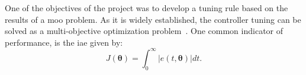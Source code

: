 %
%
One of the objectives of the project was to develop a tuning rule based on the results of a \gls{moo} problem. As it is widely established, the controller tuning can be solved as a multi-objective optimization problem~\cite{Gambier2007}. One common indicator of performance, is the \gls{iae} given by:
%
\begin{equation}  %
J(\bm{\theta})=\int_0^\infty \left |{e(t,\bm{\theta})}\right | dt.
\label{IAE}
\end{equation}

